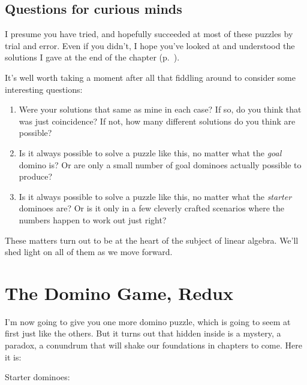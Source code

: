 \bigskip
\subsection{Questions for curious minds}

I presume you have tried, and hopefully succeeded at most of these puzzles by
trial and error. Even if you didn't, I hope you've looked at and understood the
solutions I gave at the end of the chapter (p.~\pageref{dominoPuzzleAnswers}).

It's well worth taking a moment after all that fiddling around to consider some
interesting questions:

\begin{enumerate}
\itemsep.1em

\item \label{uniqueSolution} Were your solutions that same as mine in each
case? If so, do you think that was just coincidence? If not, how many different
solutions do you think are possible?

\item \label{alwaysSolveNoMatterGoal} Is it always possible to solve a puzzle
like this, no matter what the \textit{goal} domino is? Or are only a small
number of goal dominoes actually possible to produce?

\item \label{alwaysSolveNoMatterStarters} Is it always possible to solve a
puzzle like this, no matter what the \textit{starter} dominoes are? Or is it
only in a few cleverly crafted scenarios where the numbers happen to work out
just right?

\end{enumerate}

These matters turn out to be at the heart of the subject of linear algebra.
We'll shed light on all of them as we move forward.


\section{The Domino Game, Redux}

I'm now going to give you one more domino puzzle, which is going to seem at
first just like the others. But it turns out that hidden inside is a mystery, a
paradox, a conundrum that will shake our foundations in chapters to come. Here
it is:

\label{blueDominos}
Starter dominoes:
\hspace{.3in}
\hspace{.1in}


